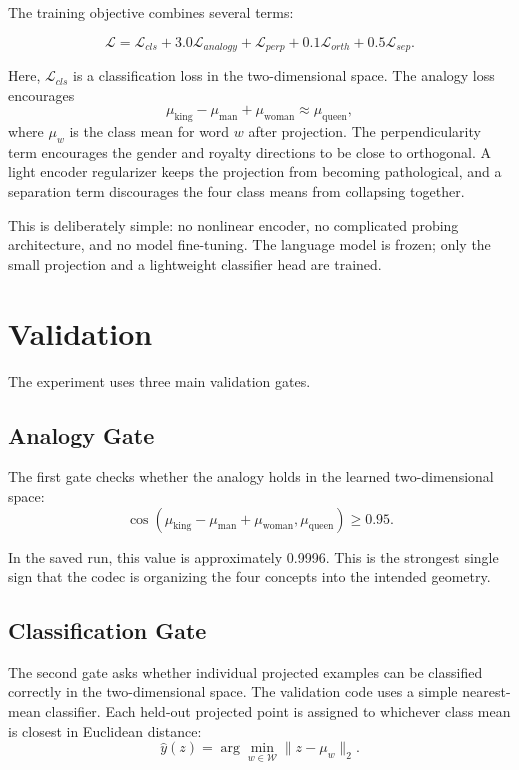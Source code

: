 \documentclass[11pt]{article}
\begin{document}
The training objective combines several terms:

\[
  \mathcal{L}
  =
  \mathcal{L}_{cls}
  + 3.0 \mathcal{L}_{analogy}
  + \mathcal{L}_{perp}
  + 0.1 \mathcal{L}_{orth}
  + 0.5 \mathcal{L}_{sep}.
\]

Here, \(\mathcal{L}_{cls}\) is a classification loss in the two-dimensional
space. The analogy loss encourages
\[
  \mu_{\mathrm{king}} - \mu_{\mathrm{man}} + \mu_{\mathrm{woman}}
  \approx
  \mu_{\mathrm{queen}},
\]
where \(\mu_w\) is the class mean for word \(w\) after projection. The
perpendicularity term encourages the gender and royalty directions to be close
to orthogonal. A light encoder regularizer keeps the projection from becoming
pathological, and a separation term discourages the four class means from
collapsing together.

This is deliberately simple: no nonlinear encoder, no complicated probing
architecture, and no model fine-tuning. The language model is frozen; only the
small projection and a lightweight classifier head are trained.

\section{Validation}

The experiment uses three main validation gates.

\subsection{Analogy Gate}

The first gate checks whether the analogy holds in the learned two-dimensional
space:
\[
  \cos(
    \mu_{\mathrm{king}} - \mu_{\mathrm{man}} + \mu_{\mathrm{woman}},
    \mu_{\mathrm{queen}}
  ) \geq 0.95.
\]

In the saved run, this value is approximately 0.9996. This is the strongest
single sign that the codec is organizing the four concepts into the intended
geometry.

\subsection{Classification Gate}

The second gate asks whether individual projected examples can be classified
correctly in the two-dimensional space. The validation code uses a simple
nearest-mean classifier. Each held-out projected point is assigned to whichever
class mean is closest in Euclidean distance:
\[
  \hat{y}(z) = \arg\min_{w \in \mathcal{W}} \|z - \mu_w\|_2.
\]
\end{document}
